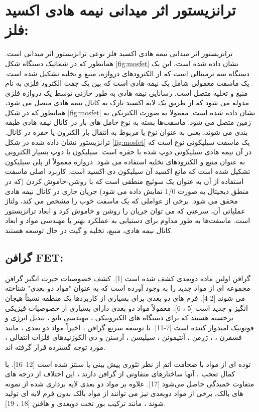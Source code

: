 \section{ترانزیستور اثر میدانی نیمه هادی اکسید فلز:}
ترانزیستور اثر میدانی نیمه هادی اکسید فلز  نوعی ترانزیستور اثر میدانی  است. همانطور که در شماتیک دستگاه شکل \ref{fig:mosfet} نشان داده شده است، این یک دستگاه سه ترمینالی است که از الکترودهای دروازه، منبع و تخلیه تشکیل شده است. یک ماسفت معمولی شامل یک نیمه هادی است که بین یک جفت الکترود فلزی به نام منبع و تخلیه متصل است. رسانایی نیمه هادی به طور خازنی توسط یک دروازه فلزی مدوله می شود که از طریق یک لایه اکسید نازک به کانال نیمه هادی متصل می شود، همانطور که در شکل \ref{fig:mosfet} نشان داده شده است. معمولا به صورت الکتریکی به زمین متصل می شود. ماسفت‌ها بسته به نوع حامل های بار در کانال نیمه هادی طبقه بندی می شوند، یعنی به عنوان نوع  یا  مربوط به انتقال بار الکترون یا حفره در کانال.
ترانزیستور نشان داده شده در شکل \ref{fig:mosfet} یک ماسفت سیلیکونی نوع  است که در آن نیمه هادی سیلیکونی دوپ شده با حفره است. سیلیکون با دوپ بسیار الکترونی  به عنوان منبع و الکترودهای تخلیه استفاده می شود. دروازه معمولاً از پلی سیلیکون تشکیل شده است که مانع اکسید آن سیلیکون دی اکسید است. کاربرد اصلی ماسفت استفاده از آن به عنوان یک سوئیچ منطقی است که با روشن-خاموش کردن (که در منطق دیجیتال به صورت 1/0 نمایش داده می شود) جریان جاری در کانال نیمه هادی محقق می شود. برخی از عواملی که یک ماسفت خوب را مشخص می کند، ولتاژ عملیاتی آن، سرعتی که می توان جریان را روشن و خاموش کرد و ابعاد ترانزیستور است. ماسفت‌ها به طور مداوم برای دستیابی به عملکرد بهتر با مهندسی مواد و ابعاد کانال نیمه هادی، منبع، تخلیه و گیت در حال توسعه هستند.

\subsection{گرافن FET:}

گرافن اولین ماده دوبعدی کشف شده است [1]. کشف خصوصیات حیرت انگیز گرافن مجموعه ای از مواد جدید را به وجود آورده است که به عنوان "مواد دو بعدی" شناخته می شوند [2-4]. فرم های دو بعدی برای بسیاری از کاربردها یک منطقه نسبتاً هیجان انگیز و جدید است [5 ، 6]. معمولاً مواد دو بعدی دارای بسیاری از خصوصیات فیزیکی برجسته هستند که برای دستگاه های الکترونیکی ، مهندسی نانو ، تبدیل انرژی و فوتونیک امیدوار کننده است [7-11]. با توسعه سریع گرافن ، اخیراً مواد دو بعدی ، مانند فسفرن ، 
 ، ژرمن ، آنتیمونن ، سیلیسن ، آرسنن و دی الكوژنیدهای فلزات انتقالی ، مورد توجه گسترده قرار گرفته اند.

توده ای از مواد با ضخامت اتم از نظر تئوری پیش بینی یا سنتز شده است [12–16]. با کمال تعجب ، آنها ساختارهای متفاوتی از گرافن دارند ، این اختلاف از درجه های متفاوت خمیدگی حاصل می‌شود [17]. علاوه بر مواد دو بعدی لایه برداری شده از نمونه های بالک، برخی از مواد دوبعدی نیز می توانند از مواد بالک بدون فرم لایه ای تولید شوند ، مانند ترکیب بور تخت دوبعدی   و هافنن [18 ، 19].

